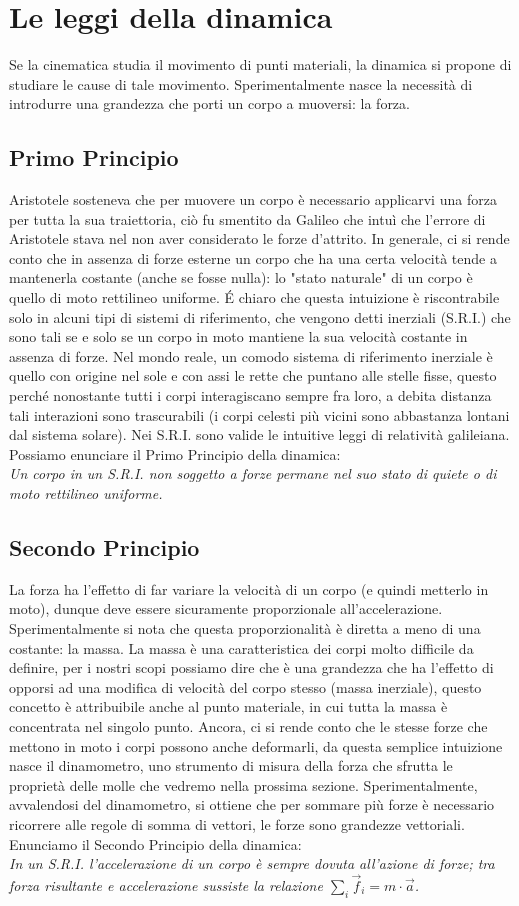 \section{Le leggi della dinamica}
Se la cinematica studia il movimento di punti materiali, la dinamica si propone di studiare le cause di tale movimento. Sperimentalmente nasce la necessità di introdurre una grandezza che porti un corpo a muoversi: la forza. 
\subsection{Primo Principio}
 Aristotele sosteneva che per muovere un corpo è necessario applicarvi una forza per tutta la sua traiettoria, ciò fu smentito da Galileo che intuì che l'errore di Aristotele stava nel non aver considerato le forze d'attrito. In generale, ci si rende conto che in assenza di forze esterne un corpo che ha una certa velocità tende a mantenerla costante (anche se fosse nulla): lo "stato naturale" di un corpo è quello di moto rettilineo uniforme. \'{E} chiaro che questa intuizione è riscontrabile solo in alcuni tipi di sistemi di riferimento, che vengono detti inerziali (S.R.I.) che sono tali se e solo se un corpo in moto mantiene la sua velocità costante in assenza di forze. Nel mondo reale, un comodo sistema di riferimento inerziale è quello con origine nel sole e con assi le rette che puntano alle stelle fisse, questo perché nonostante tutti i corpi interagiscano sempre fra loro, a debita distanza tali interazioni sono trascurabili (i corpi celesti più vicini sono abbastanza lontani dal sistema solare). Nei S.R.I. sono valide le intuitive leggi di relatività galileiana. Possiamo enunciare il Primo Principio della dinamica:\\
 \textit{Un corpo in un S.R.I. non soggetto a forze permane nel suo stato di quiete o di moto rettilineo uniforme.}
 \subsection{Secondo Principio}
 La forza ha l'effetto di far variare la velocità di un corpo (e quindi metterlo in moto), dunque deve essere sicuramente proporzionale all'accelerazione. Sperimentalmente si nota che questa proporzionalità è diretta a meno di una costante: la massa. La massa è una caratteristica dei corpi molto difficile da definire, per i nostri scopi possiamo dire che è una grandezza che ha l'effetto di opporsi ad una modifica di velocità del corpo stesso (massa inerziale), questo concetto è attribuibile anche al punto materiale, in cui tutta la massa è concentrata nel singolo punto. Ancora, ci si rende conto che le stesse forze che mettono in moto i corpi possono anche deformarli, da questa semplice intuizione nasce il dinamometro, uno strumento di misura della forza che sfrutta le proprietà delle molle che vedremo nella prossima sezione. Sperimentalmente, avvalendosi del dinamometro, si ottiene che per sommare più forze è necessario ricorrere alle regole di somma di vettori, le forze sono grandezze vettoriali. Enunciamo il Secondo Principio della dinamica:\\
 \textit{In un S.R.I. l'accelerazione di un corpo è sempre dovuta all'azione di forze; tra forza risultante e accelerazione sussiste la relazione $\sum_{i} \vec{f}_i = m \cdot \vec{a}$.}
